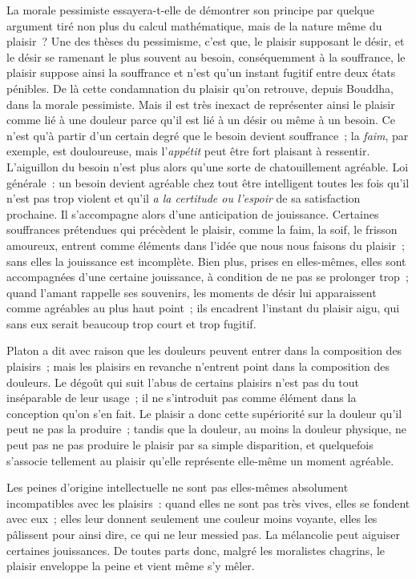 \documentclass[french,twoside]{book} %
\begin{document}
La morale pessimiste essayera-t-elle de démontrer son principe par quelque argument tiré non plus du calcul mathématique, mais de la nature même du plaisir ? Une des thèses du pessimisme, c’est que, le plaisir supposant le désir, et le désir se ramenant le plus souvent au besoin, conséquemment à la souffrance, le plaisir suppose ainsi la souffrance et n’est qu’un instant fugitif entre deux états pénibles. De là cette condamnation du plaisir qu’on retrouve, depuis Bouddha, dans la morale pessimiste. Mais il est très inexact de représenter ainsi le plaisir comme lié à une douleur parce qu’il est lié à un désir ou même à un besoin. Ce n’est qu’à partir d’un certain degré que le besoin devient souffrance ; la \emph{faim}, par exemple, est douloureuse, mais l’\emph{appétit} peut être fort plaisant à ressentir. L’aiguillon du besoin n’est plus alors qu’une sorte de chatouillement agréable. Loi générale : un besoin devient agréable chez tout être intelligent toutes les fois qu’il n’est pas trop violent et qu’il \emph{a la certitude ou l’espoir} de sa satisfaction prochaine. Il s’accompagne alors d’une anticipation de jouissance. Certaines souffrances prétendues qui précèdent le plaisir, comme la faim, la soif, le frisson amoureux, entrent comme éléments dans l’idée que nous nous faisons du plaisir ; sans elles la jouissance est incomplète. Bien plus, prises en elles-mêmes, elles sont accompagnées d’une certaine jouissance, à condition de ne pas se prolonger trop ; quand l’amant rappelle ses souvenirs, les moments de désir lui apparaissent comme agréables au plus haut point ; ils encadrent l’instant du plaisir aigu, qui sans eux serait beaucoup trop court et trop fugitif.\par
Platon a dit avec raison que les douleurs peuvent entrer dans la composition des plaisirs ; mais les plaisirs en revanche n’entrent point dans la composition des douleurs. Le dégoût qui suit l’abus de certains plaisirs n’est pas du tout inséparable de leur usage ; il ne s’introduit pas comme élément dans la conception qu’on s’en fait. Le plaisir a donc cette supériorité sur la douleur qu’il peut ne pas la produire ; tandis que la douleur, au moins la douleur physique, ne peut pas ne pas produire le plaisir par sa simple disparition, et quelquefois s’associe tellement au plaisir qu’elle représente elle-même un moment agréable.\par
Les peines d’origine intellectuelle ne sont pas elles-mêmes absolument incompatibles avec les plaisirs : quand elles ne sont pas très vives, elles se fondent avec eux ; elles leur donnent seulement une couleur moins voyante, elles les pâlissent pour ainsi dire, ce qui ne leur messied pas. La mélancolie peut aiguiser certaines jouissances. De toutes parts donc, malgré les moralistes chagrins, le plaisir enveloppe la peine et vient même s’y mêler.\par
\end{document}
